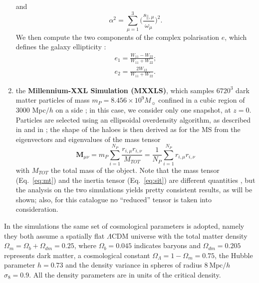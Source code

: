 \documentclass[a4paper,fleqn,usenatbib]{mnras}
\begin{document}
\begin{enumerate}
and 
\begin{equation}
    \alpha^2=\sum_{\mu = 1}^{3} \bigg( \frac{s_{\mathbin{\|}, \mu}}{\omega_{\mu}} \bigg)^2.
	\label{eq:alpha}
\end{equation}
We then compute the two components of the complex polarisation $e$, which defines the galaxy ellipticity \citep{BartelmannSchneider2001}:
\begin{align}
    	e_{1} = \frac{W_{11} - W_{22}}{W_{11} + W_{22}}; \\ 
           e_{2} = \frac{2 W_{12}}{W_{11} + W_{22}}.
\end{align}
\item the \textbf{Millennium-XXL Simulation (MXXLS)}, which samples $6720^3$ dark matter particles of mass $m_P = 8.456 \times 10^9 M_{\sun}$ confined in a cubic region of $3000$ Mpc$/h$ on a side \citep{Anguloetal2012}; in this case, we consider only one snapshot, at $z = 0$. Particles are selected using an ellipsoidal overdensity algorithm, as described in \citet{Despalietal2013} and in \citet{Bonamigoetal2015}; the shape of the haloes is then derived as for the MS from the eigenvectors and eigenvalues of the mass tensor 
\begin{equation}
    \mathbf{M}_{\mu \nu} = m_P \sum_{i=1}^{N_P} \frac{r_{i, \mu} r_{i, \nu}}{M_{TOT}} = \frac{1}{N_P} \sum_{i=1}^{N_P} r_{i, \mu} r_{i, \nu}
	\label{eq:mt}
\end{equation}
with $M_{TOT}$ the total mass of the object. Note that the mass tensor (Eq.~\ref{eq:mt}) and the inertia tensor (Eq.~\ref{eq:sit}) are different quantities \citep{Bettetal2007},  but the analysis on the two simulations yields pretty consistent results, as will be shown; also, for this catalogue no ``reduced'' tensor is taken into consideration.
\end{enumerate}

In the simulations the same set of cosmological parameters is adopted, namely they both assume a spatially flat $\Lambda$CDM universe with the total matter density $\Omega_m = \Omega_b + \Omega_{dm} = 0.25$, where $\Omega _b = 0.045$ indicates baryons and $\Omega_{dm} = 0.205$ represents dark matter, a cosmological constant $\Omega_{\Lambda} = 1 - \Omega_m = 0.75$, the Hubble parameter $h = 0.73$ and the density variance in spheres of radius $8 \ \mbox{Mpc}/h$ $\sigma_8 = 0.9$. All the density parameters are in units of the critical density.
\end{document}
